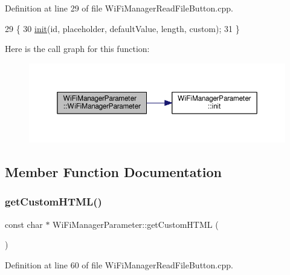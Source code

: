 Definition at line 29 of file Wi\+Fi\+Manager\+Read\+File\+Button.\+cpp.


\begin{DoxyCode}
29                                                                                                            
                                       \{
30   \hyperlink{class_wi_fi_manager_parameter_a137b764027d3851a428f3ab185a5660f}{init}(\textcolor{keywordtype}{id}, placeholder, defaultValue, length, custom);
31 \}
\end{DoxyCode}
Here is the call graph for this function\+:\nopagebreak
\begin{figure}[H]
\begin{center}
\leavevmode
\includegraphics[width=350pt]{d7/d08/class_wi_fi_manager_parameter_a45967e1d29d52f5fc8e47e99cb693b98_cgraph}
\end{center}
\end{figure}


\subsection{Member Function Documentation}
\mbox{\label{class_wi_fi_manager_parameter_a596273c189eb40107500cee3ad31b13b}} 
\subsubsection{\texorpdfstring{get\+Custom\+H\+T\+M\+L()}{getCustomHTML()}}
{\footnotesize\ttfamily const char $\ast$ Wi\+Fi\+Manager\+Parameter\+::get\+Custom\+H\+T\+ML (\begin{DoxyParamCaption}{ }\end{DoxyParamCaption})}



Definition at line 60 of file Wi\+Fi\+Manager\+Read\+File\+Button.\+cpp.


